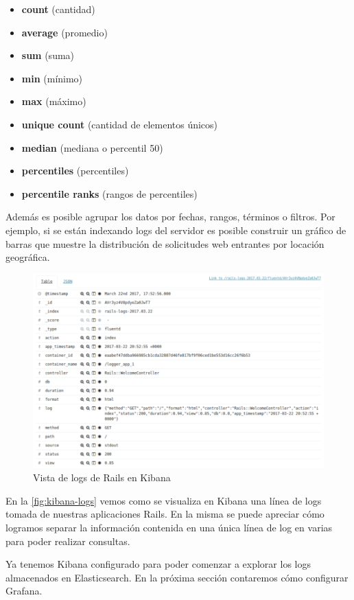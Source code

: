 \begin{itemize}
  \item \textbf{count} (cantidad)
  \item \textbf{average} (promedio)
  \item \textbf{sum} (suma)
  \item \textbf{min} (mínimo)
  \item \textbf{max} (máximo)
  \item \textbf{unique count} (cantidad de elementos únicos)
  \item \textbf{median} (mediana o percentil 50)
  \item \textbf{percentiles} (percentiles)
  \item \textbf{percentile ranks} (rangos de percentiles)
\end{itemize}



Además es posible agrupar los datos por fechas, rangos, términos o filtros. Por ejemplo, si se están indexando logs del servidor es posible construir un gráfico de barras que muestre la distribución de solicitudes web entrantes por locación geográfica.


\begin{figure}
  \includegraphics[width=\linewidth]{src/images/05-capitulo-5/kibana-logs.png}
  \caption{Vista de logs de Rails en Kibana}
  \label{fig:kibana-logs}
\end{figure}

En la \autoref{fig:kibana-logs} vemos como se visualiza en Kibana una línea de logs tomada de nuestras aplicaciones Rails. En la misma se puede apreciar cómo logramos separar la información contenida en una única línea de log en varias para poder realizar consultas.

Ya tenemos Kibana configurado para poder comenzar a explorar los logs almacenados en Elasticsearch. En la próxima sección contaremos cómo configurar Grafana.
